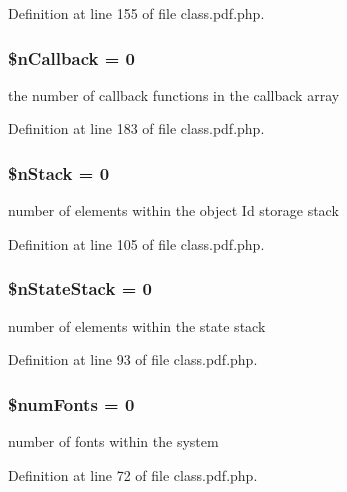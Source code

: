 \-Definition at line 155 of file class.\-pdf.\-php.

\hypertarget{class_cpdf_a894ee84a4cce4aed0afd68456ef6685d}{
\subsubsection[{\$n\-Callback}]{\setlength{\rightskip}{0pt plus 5cm}\$n\-Callback = 0}}\label{class_cpdf_a894ee84a4cce4aed0afd68456ef6685d}
the number of callback functions in the callback array 

\-Definition at line 183 of file class.\-pdf.\-php.

\hypertarget{class_cpdf_a9de4b5d2209348f2e4479bdfbaa81c6a}{
\subsubsection[{\$n\-Stack}]{\setlength{\rightskip}{0pt plus 5cm}\$n\-Stack = 0}}\label{class_cpdf_a9de4b5d2209348f2e4479bdfbaa81c6a}
number of elements within the object \-Id storage stack 

\-Definition at line 105 of file class.\-pdf.\-php.

\hypertarget{class_cpdf_a45de2d60d68c9dcdd4aff475303520f3}{
\subsubsection[{\$n\-State\-Stack}]{\setlength{\rightskip}{0pt plus 5cm}\$n\-State\-Stack = 0}}\label{class_cpdf_a45de2d60d68c9dcdd4aff475303520f3}
number of elements within the state stack 

\-Definition at line 93 of file class.\-pdf.\-php.

\hypertarget{class_cpdf_a78cfbb4859f40b0d205596bf7542bc10}{
\subsubsection[{\$num\-Fonts}]{\setlength{\rightskip}{0pt plus 5cm}\$num\-Fonts = 0}}\label{class_cpdf_a78cfbb4859f40b0d205596bf7542bc10}
number of fonts within the system 

\-Definition at line 72 of file class.\-pdf.\-php.


